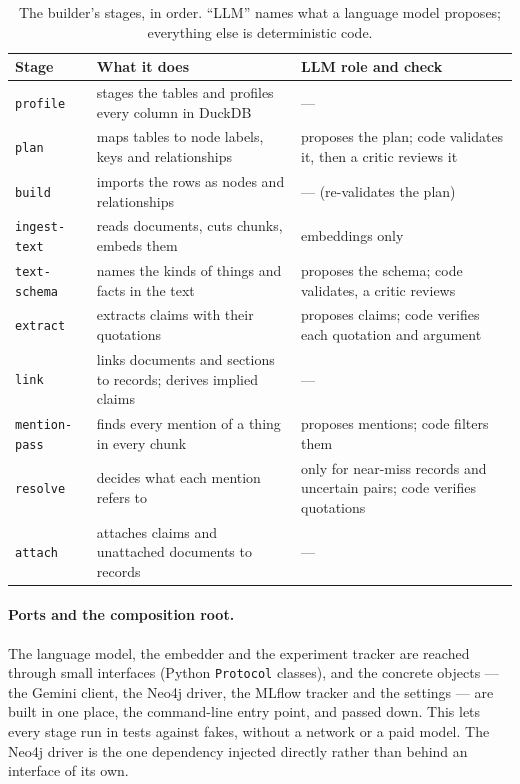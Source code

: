 \begin{table}[htbp]
\centering
\caption{The builder's stages, in order. ``LLM'' names what a language model proposes; everything else is
deterministic code.}
\label{tab:builder-stages}
\small
\begin{tabularx}{\linewidth}{@{}lXX@{}}
\toprule
Stage & What it does & LLM role and check \\
\midrule
\texttt{profile} & stages the tables and profiles every column in DuckDB & --- \\
\texttt{plan} & maps tables to node labels, keys and relationships & proposes the plan; code validates it, then a critic reviews it \\
\texttt{build} & imports the rows as nodes and relationships & --- (re-validates the plan) \\
\texttt{ingest-text} & reads documents, cuts chunks, embeds them & embeddings only \\
\texttt{text-schema} & names the kinds of things and facts in the text & proposes the schema; code validates, a critic reviews \\
\texttt{extract} & extracts claims with their quotations & proposes claims; code verifies each quotation and argument \\
\texttt{link} & links documents and sections to records; derives implied claims & --- \\
\texttt{mention-pass} & finds every mention of a thing in every chunk & proposes mentions; code filters them \\
\texttt{resolve} & decides what each mention refers to & only for near-miss records and uncertain pairs; code verifies quotations \\
\texttt{attach} & attaches claims and unattached documents to records & --- \\
\bottomrule
\end{tabularx}
\end{table}

\paragraph{Ports and the composition root.} The language model, the embedder and the experiment tracker are
reached through small interfaces (Python \texttt{Protocol} classes), and the concrete objects --- the Gemini
client, the Neo4j driver, the MLflow tracker and the settings --- are built in one place, the command-line entry
point, and passed down. This lets every stage run in tests against fakes, without a network or a paid model.
The Neo4j driver is the one dependency injected directly rather than behind an interface of its own.

